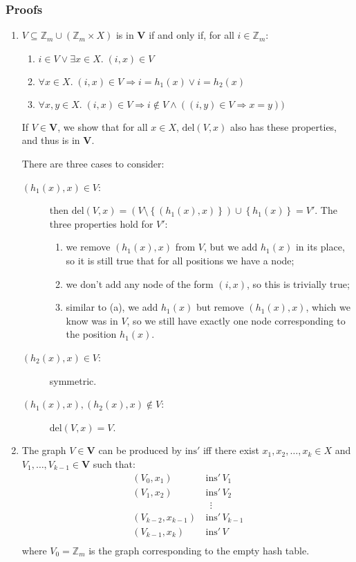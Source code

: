 \documentclass[a4paper, 12pt]{article}
\begin{document}
\subsubsection*{Proofs}
\begin{enumerate}
\item \(V\subseteq \mathbb Z_{m} \cup (\mathbb Z_{m} \times X)\) is in \(\mathbf{V}\) if and only if, for all \(i \in \mathbb Z_{m}\):
  \begin{enumerate}
  \item \(i \in V \vee \exists x \in X.\; (i, x) \in V\)
  \item \(\forall x \in X.\; (i, x) \in V \Rightarrow i = h_1(x) \vee i = h_2(x)\)
  \item \(\forall x,y \in X.\; (i, x) \in V \Rightarrow i \notin V \wedge ((i, y) \in V \Rightarrow x = y))\)
  \end{enumerate}

  If \(V \in \mathbf{V}\), we show that for all \(x \in X\), \(\mathrm{del}(V, x)\) also has these properties, and thus is in \(\mathbf{V}\).

  There are three cases to consider:
  \begin{description}
  \item[\((h_1(x),x) \in V\):] then \(\mathrm{del}(V,x) = (V \setminus \left\{ (h_1(x), x) \right\}) \cup \left\{ h_1(x) \right\} = V'\). The three properties hold for \(V'\):
    \begin{enumerate}
    \item we remove \((h_1(x), x)\) from \(V\), but we add \(h_1(x)\) in its place, so it is still true that for all positions we have a node;
    \item we don't add any node of the form \((i, x)\), so this is trivially true;
    \item similar to (a), we add \(h_1(x)\) but remove \((h_1(x), x)\), which we know was in \(V\), so we still have exactly one node corresponding to the position \(h_1(x)\).
    \end{enumerate}
  \item[\((h_2(x),x) \in V\):] symmetric.
  \item[\((h_1(x),x),(h_2(x),x) \notin V\):] \(\mathrm{del}(V,x)=V\).
  \end{description}

\item The graph \(V \in \mathbf V\) can be produced by \(\mathrm{ins'}\) iff there exist \(x_1,x_2,\dots,x_{k} \in X\) and \(V_1,\dots,V_{k-1} \in \mathbf{V}\) such that:
  \begin{align*}
    (V_0, x_1)\,&\mathrm{ins'}\,V_1 \\
    (V_1, x_2)\,&\mathrm{ins'}\,V_2 \\
    &\;\,\vdots \\
    (V_{k-2}, x_{k-1})\,&\mathrm{ins'}\,V_{k-1} \\
    (V_{k-1}, x_k)\,&\mathrm{ins'}\,V \\
  \end{align*}
  where \(V_0 = \mathbb Z_{m}\) is the graph corresponding to the empty hash table.


\end{enumerate}
\end{document}
